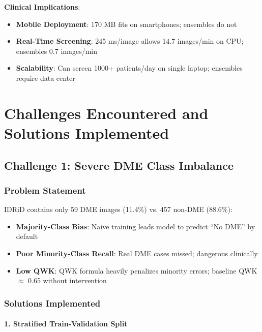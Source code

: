 \documentclass[12pt,a4paper]{article}
\begin{document}
\textbf{Clinical Implications}:

\begin{itemize}
    \item \textbf{Mobile Deployment}: 170 MB fits on smartphones; ensembles do not
    \item \textbf{Real-Time Screening}: 245 ms/image allows 14.7 images/min on CPU; ensembles 0.7 images/min
    \item \textbf{Scalability}: Can screen 1000+ patients/day on single laptop; ensembles require data center
\end{itemize}

\newpage

\section{Challenges Encountered and Solutions Implemented}

\subsection{Challenge 1: Severe DME Class Imbalance}

\subsubsection{Problem Statement}

IDRiD contains only 59 DME images (11.4\%) vs. 457 non-DME (88.6\%):

\begin{itemize}
    \item \textbf{Majority-Class Bias}: Naive training leads model to predict ``No DME'' by default
    \item \textbf{Poor Minority-Class Recall}: Real DME cases missed; dangerous clinically
    \item \textbf{Low QWK}: QWK formula heavily penalizes minority errors; baseline QWK $\approx$ 0.65 without intervention
\end{itemize}

\subsubsection{Solutions Implemented}

\paragraph{1. Stratified Train-Validation Split}
\end{document}
